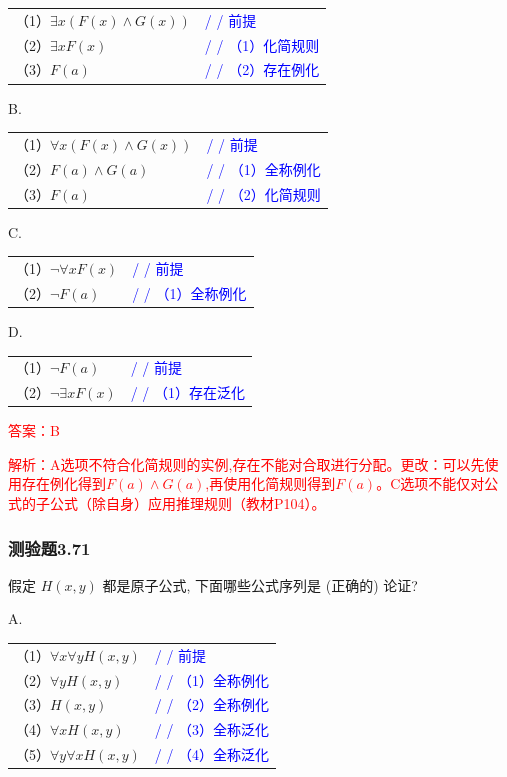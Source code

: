\documentclass[UTF8, heading=true]{ctexart}
\begin{document}
\begin{tabular}{ll}
  （1）$\exists x(F(x) \wedge G(x))$ & \textcolor{blue}{/ / 前提} \\
  （2）$\exists x F(x)$ & \textcolor{blue}{/ / （1）化简规则} \\
  （3）$F(a)$ & \textcolor{blue}{/ / （2）存在例化}
\end{tabular}

B.

\begin{tabular}{ll}
  （1）$\forall x(F(x) \wedge G(x))$ & \textcolor{blue}{/ / 前提} \\
  （2）$F(a) \wedge G(a)$ & \textcolor{blue}{/ / （1）全称例化} \\
  （3）$F(a)$ & \textcolor{blue}{/ / （2）化简规则}
\end{tabular}


C.

\begin{tabular}{ll}
  （1）$\neg \forall x F(x)$ & \textcolor{blue}{/ / 前提} \\
  （2）$\neg F(a)$ & \textcolor{blue}{/ / （1）全称例化}
\end{tabular}

D.

\begin{tabular}{ll}
  （1）$\neg F(a)$ & \textcolor{blue}{/ / 前提} \\
  （2）$\neg \exists x F(x)$ & \textcolor{blue}{/ / （1）存在泛化}
\end{tabular}


\textcolor{red}{答案：B}

\textcolor{red}{解析：A选项不符合化简规则的实例,存在不能对合取进行分配。更改：可以先使用存在例化得到$F(a)\wedge G(a)$,再使用化简规则得到$F(a)$。C选项不能仅对公式的子公式（除自身）应用推理规则（教材P104）。}

\subsubsection{测验题3.71}

假定 $H(x, y)$ 都是原子公式, 下面哪些公式序列是 (正确的) 论证?

A.

\begin{tabular}{ll}
  （1）$\forall x \forall y H(x, y)$ & \textcolor{blue}{/ / 前提} \\
  （2）$\forall y H(x, y)$ & \textcolor{blue}{/ / （1）全称例化} \\
  （3）$H(x, y)$ & \textcolor{blue}{/ / （2）全称例化} \\
  （4）$\forall x H(x, y)$ & \textcolor{blue}{/ / （3）全称泛化} \\
  （5）$\forall y \forall x H(x, y)$ & \textcolor{blue}{/ / （4）全称泛化}
\end{tabular}
\end{document}
